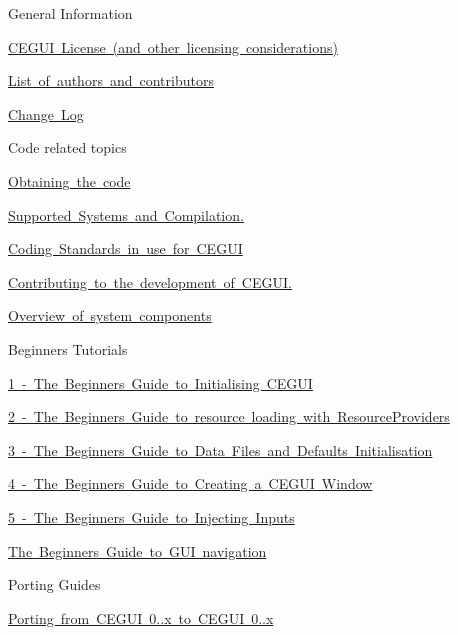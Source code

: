 \begin{DoxyItemize}
\item General Information
\begin{DoxyItemize}
\item \mbox{\hyperlink{licensing}{C\+E\+G\+UI License (and other licensing considerations)}}
\item \mbox{\hyperlink{authors}{List of authors and contributors}}
\item \mbox{\hyperlink{change_log}{Change Log}}
\end{DoxyItemize}
\item Code related topics
\begin{DoxyItemize}
\item \mbox{\hyperlink{downloading}{Obtaining the code}}
\item \mbox{\hyperlink{compiling}{Supported Systems and Compilation.}}
\item \mbox{\hyperlink{code_standards}{Coding Standards in use for C\+E\+G\+UI}}
\item \mbox{\hyperlink{devel}{Contributing to the development of C\+E\+G\+UI.}}
\item \mbox{\hyperlink{arch_overview}{Overview of system components}}
\end{DoxyItemize}
\item Beginners Tutorials
\begin{DoxyItemize}
\item \mbox{\hyperlink{rendering_tutorial}{1 -\/ The Beginners Guide to Initialising C\+E\+G\+UI}}
\item \mbox{\hyperlink{resprov_tutorial}{2 -\/ The Beginners Guide to resource loading with Resource\+Providers}}
\item \mbox{\hyperlink{datafile_tutorial}{3 -\/ The Beginners Guide to Data Files and Defaults Initialisation}}
\item \mbox{\hyperlink{window_tutorial}{4 -\/ The Beginners Guide to Creating a C\+E\+G\+UI Window}}
\item \mbox{\hyperlink{input_tutorial}{5 -\/ The Beginners Guide to Injecting Inputs}}
\item \mbox{\hyperlink{gui_navigation_tutorial}{The Beginners Guide to G\+UI navigation}}
\end{DoxyItemize}
\item Porting Guides
\begin{DoxyItemize}
\item \mbox{\hyperlink{porting7to8}{Porting from C\+E\+G\+UI 0..\+x to C\+E\+G\+UI 0..\+x}}

\end{DoxyItemize}
\end{DoxyItemize}
